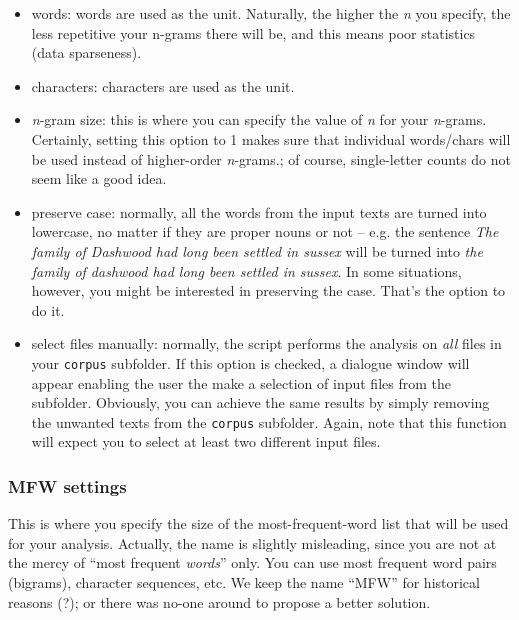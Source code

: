 \documentclass[11pt,a4paper]{article}
\def\margin#1{\marginpar{\textcolor{blue}{\footnotesize\tt #1}}}
\def\code#1{{\tt #1}}
\begin{document}
\begin{itemize}
\item words: words are used as the unit. Naturally, the higher the \emph{n}
you specify, the less repetitive your n-grams there will be, and this
means poor statistics (data sparseness).\margin{analyzed.features=}\margin{"w"} 

\item characters: characters are used as the unit.\margin{"c"}

\item \emph{n}-gram size: this is where you can specify the value of \emph{n}
for your \emph{n}-grams. Certainly, setting this option to 1 makes
sure that individual words/chars will be used instead of higher-order
\emph{n}-grams.\margin{ngram.size=}\margin{<integer>}; of course,
single-letter counts do not seem like a good idea.

\item preserve case:\margin{preserve.case=}\margin{TRUE|FALSE} normally, all the words from the input texts are turned into lowercase, no matter if they are proper nouns or not -- e.g. the sentence \textit{The family of Dashwood had long been settled in sussex} will be turned into \textit{the family of dashwood had long been settled in sussex}. In some situations, however, you might be interested in preserving the case. That's the option to do it.

\item select files manually: normally, the script performs the analysis
on \emph{all} files in your \code{corpus} subfolder. If this option
is checked, a dialogue window will appear enabling the user the make
a selection of input files from the subfolder. Obviously, you can
achieve the same results by simply removing the unwanted texts from
the \code{corpus} subfolder. Again, note that this function will
expect you to select at least two different input files.\margin{[TBD]}
\end{itemize}


\subsubsection{MFW settings}

This is where you specify the size of the most-frequent-word list
that will be used for your analysis. Actually, the name is slightly
misleading, since you are not at the mercy of ``most frequent \emph{words}''
only. You can use most frequent word pairs (bigrams), character sequences,
etc. We keep the name ``MFW'' for historical reasons (?); or there was
no-one around to propose a better solution.
\end{document}
